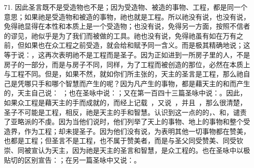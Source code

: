 71. 因此圣言既不是受造物也不是；因为受造物、被造的事物、工程，都是同一个意思；如果祂是受造物和被造的事物，祂也就是工程。所以祂没有说，也没有说，免得祂显得在本性和本质上是一个受造物；也没有说，免得另一方面，按照不信者的谬见，祂似乎是为了我们而被做的工具。祂也没有说，免得祂虽有如在万有之前，但如果也在众工程之前受造，就会给和赋予同一含义。而是极其精确地说；这等于说：，这再次表明祂不是工程而是圣子。因为正如进到一所房子里的人，不是房子的一部分，而是与房子不同，同样，为了工程而被创造的那位，必然在本质上与工程不同。但是，如果不然，就如你们所主张的，天主的圣言是工程，那么祂自己是凭哪只手和哪个智慧而产生的呢？因为凡产生的事物，都是藉天主的和而产生的，天主自己说：~；也在圣咏中说：；又在第一百四十三篇圣咏中说：。因此，如果众工程是藉天主的手而成就的，而经上记载~，又说~，并且~，那么很清楚，圣子不可能是工程，相反，祂是天主的手和智慧。认识到这一点的的，、和，谴责了亚略派的不虔。因为当他们说时，他们列举了天上的事物、地上的事物和整个受造界，作为工程；却未提圣子。因为他们没有说，为表明其他一切事物都在赞美，也都是工程；但圣言不是工程，也不属于赞美者，而是与圣父同受赞美、同受钦崇、同被宣认为天主，因为祂是天主的圣言和智慧，是众工程的。也在圣咏中以极贴切的区别宣告：；在另一篇圣咏中又说：。\par

